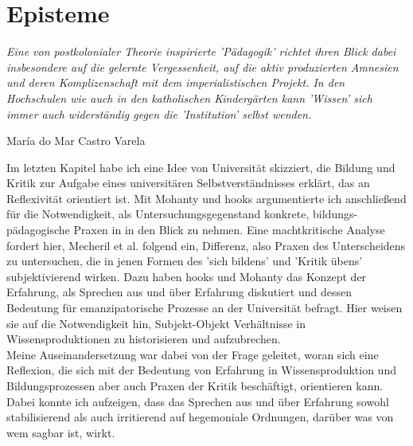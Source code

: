 \section{Episteme} \epigraph{\textit{ Eine von postkolonialer Theorie
inspirierte 'Pädagogik' richtet ihren Blick dabei insbesondere auf die
gelernte Vergessenheit, auf die aktiv produzierten Amnesien und deren
Komplizenschaft mit dem imperialistischen Projekt. In den Hochschulen wie auch
in den katholischen Kindergärten kann 'Wissen' sich immer auch
widerständig gegen die 'Institution' selbst wenden. }}{María do Mar
Castro Varela\footnotemark}  

Im letzten Kapitel habe ich eine Idee von Universität skizziert,
die Bildung und Kritik zur Aufgabe eines universitären Selbstverständnisses
erklärt, das an Reflexivität orientiert ist. Mit Mohanty und hooks argumentierte
ich anschließend für die Notwendigkeit, als Untersuchungsgegenstand konkrete,
bildungs-pädagogische Praxen in in den Blick zu nehmen. Eine machtkritische
Analyse fordert hier, Mecheril et al. folgend ein, Differenz, also Praxen des
Unterscheidens zu untersuchen, die in jenen Formen des 'sich bildens' und
'Kritik übens' subjektivierend wirken. Dazu haben hooks und Mohanty das Konzept
der Erfahrung, als Sprechen aus und über Erfahrung diskutiert und dessen
Bedeutung für emanzipatorische Prozesse an der Universität befragt. Hier weisen
sie auf die Notwendigkeit hin, Subjekt-Objekt Verhältnisse in
Wissensproduktionen zu historisieren und aufzubrechen.\\
Meine Auseinandersetzung
war dabei von der Frage geleitet, woran sich eine Reflexion, die sich mit der
Bedeutung von Erfahrung in Wissensproduktion und Bildungsprozessen aber auch
Praxen der Kritik beschäftigt, orientieren kann. Dabei konnte ich aufzeigen,
dass das Sprechen aus und über Erfahrung sowohl stabilisierend als auch
irritierend auf hegemoniale Ordnungen, darüber was von wem sagbar ist, wirkt.\\

